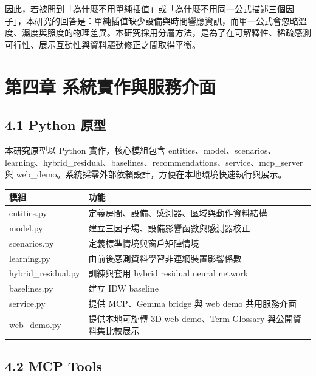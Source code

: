 \documentclass[12pt,a4paper]{article}
\begin{document}
因此，若被問到「為什麼不用單純插值」或「為什麼不用同一公式描述三個因子」，本研究的回答是：單純插值缺少設備與時間響應資訊，而單一公式會忽略溫度、濕度與照度的物理差異。本研究採用分層方法，是為了在可解釋性、稀疏感測可行性、展示互動性與資料驅動修正之間取得平衡。


\clearpage

\section*{第四章 系統實作與服務介面}

\subsection*{4.1 Python 原型}

本研究原型以 Python 實作，核心模組包含 entities、model、scenarios、learning、hybrid\_\allowbreak{}residual、baselines、recommendations、service、mcp\_\allowbreak{}server 與 web\_\allowbreak{}demo。系統採零外部依賴設計，方便在本地環境快速執行與展示。


\begin{table}[htbp]
\centering
\footnotesize
\renewcommand{\arraystretch}{1.25}
\begin{tabular}{|>{\raggedright\arraybackslash}p{}|>{\raggedright\arraybackslash}p{}|}
\hline
\textbf{模組} & \textbf{功能} \\
\hline
entities.py & 定義房間、設備、感測器、區域與動作資料結構 \\
\hline
model.py & 建立三因子場、設備影響函數與感測器校正 \\
\hline
scenarios.py & 定義標準情境與窗戶矩陣情境 \\
\hline
learning.py & 由前後感測資料學習非連網裝置影響係數 \\
\hline
hybrid\_\allowbreak{}residual.py & 訓練與套用 hybrid residual neural network \\
\hline
baselines.py & 建立 IDW baseline \\
\hline
service.py & 提供 MCP、Gemma bridge 與 web demo 共用服務介面 \\
\hline
web\_\allowbreak{}demo.py & 提供本地可旋轉 3D web demo、Term Glossary 與公開資料集比較展示 \\
\hline
\end{tabular}
\end{table}

\subsection*{4.2 MCP Tools}
\end{document}
